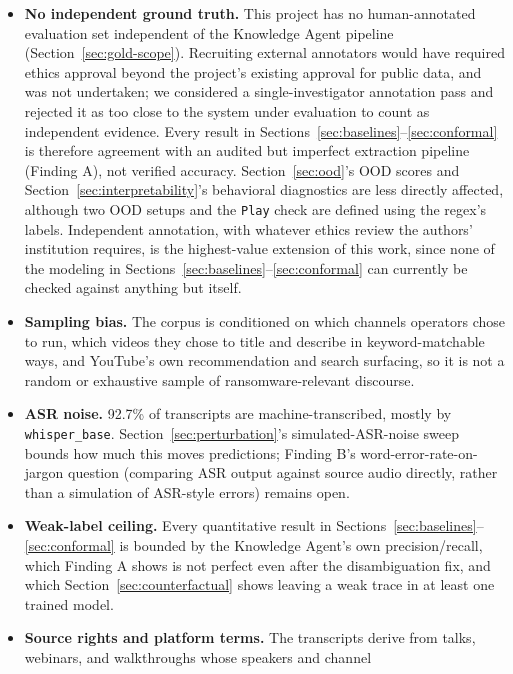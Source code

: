 \documentclass[preprint,12pt]{elsarticle}
\begin{document}
\begin{itemize}
  \item \textbf{No independent ground truth.} This project has no
    human-annotated evaluation set independent of the Knowledge Agent
    pipeline (Section~\ref{sec:gold-scope}). Recruiting external annotators
    would have required ethics approval beyond the project's existing
    approval for public data, and was not undertaken; we considered a
    single-investigator annotation pass and rejected it as too close to the
    system under evaluation to count as independent evidence. Every result in
    Sections~\ref{sec:baselines}--\ref{sec:conformal} is therefore agreement
    with an audited but imperfect extraction pipeline (Finding A), not verified
    accuracy. Section~\ref{sec:ood}'s OOD scores and
    Section~\ref{sec:interpretability}'s behavioral diagnostics are less
    directly affected, although two OOD setups and the \texttt{Play} check are
    defined using the regex's labels. Independent annotation, with whatever
    ethics review the authors' institution requires, is the highest-value
    extension of this work, since none of the modeling in
    Sections~\ref{sec:baselines}--\ref{sec:conformal} can currently be checked
    against anything but itself.
  \item \textbf{Sampling bias.} The corpus is conditioned on which
    channels operators chose to run, which videos they chose to title and
    describe in keyword-matchable ways, and YouTube's own recommendation
    and search surfacing, so it is not a random or exhaustive sample of
    ransomware-relevant discourse.
  \item \textbf{ASR noise.} 92.7\% of transcripts are machine-transcribed,
    mostly by \texttt{whisper\_base}. Section~\ref{sec:perturbation}'s
    simulated-ASR-noise sweep bounds how much this moves predictions;
    Finding B's word-error-rate-on-jargon question (comparing ASR output
    against source audio directly, rather than a simulation of ASR-style
    errors) remains open.
  \item \textbf{Weak-label ceiling.} Every quantitative result in
    Sections~\ref{sec:baselines}--\ref{sec:conformal} is bounded by the
    Knowledge Agent's own precision/recall, which Finding A shows is not
    perfect even after the disambiguation fix, and which
    Section~\ref{sec:counterfactual} shows leaving a weak trace in at
    least one trained model.
  \item \textbf{Source rights and platform terms.} The transcripts derive
    from talks, webinars, and walkthroughs whose speakers and channel

\end{itemize}
\end{document}
